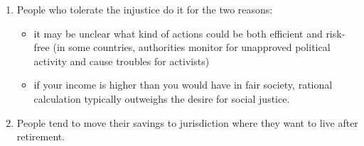 \documentclass[11pt]{article}
\theoremstyle{remark}
\theoremstyle{definition}
\begin{document}
\begin{enumerate}




\item People who tolerate the injustice do it for the two reasons:
\begin{itemize}
\item it may be unclear what kind of actions could be both efficient and risk-free (in some countries, authorities monitor for unapproved political activity and cause troubles for activists)

\item if your income is higher than you would have in fair society, rational calculation typically outweighs the desire for social justice.
\end{itemize}

\item People tend to move their savings to jurisdiction where they want to live after retirement. %





\end{enumerate}
\end{document}
